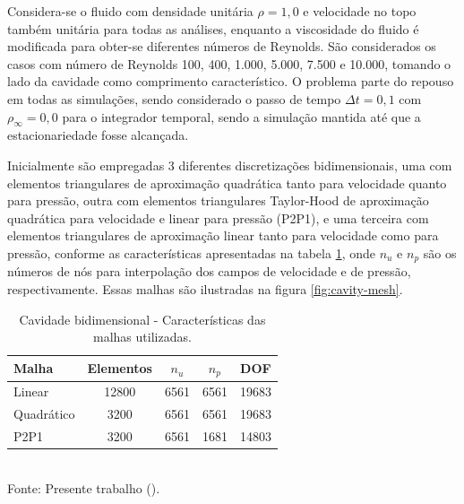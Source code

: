 Considera-se o fluido com densidade unitária $\rho=1,0$ e velocidade no topo também unitária para todas as análises, enquanto a viscosidade do fluido é modificada para obter-se diferentes números de Reynolds. São considerados os casos com número de Reynolds 100, 400, 1.000, 5.000, 7.500 e 10.000, tomando o lado da cavidade como comprimento característico. O problema parte do repouso em todas as simulações, sendo considerado o passo de tempo $\Delta t=0,1$ com $\rho_\infty=0,0$ para o integrador temporal, sendo a simulação mantida até que a estacionariedade fosse alcançada.

Inicialmente são empregadas 3 diferentes discretizações bidimensionais, uma com elementos triangulares de aproximação quadrática tanto para velocidade quanto para pressão, outra com elementos triangulares Taylor-Hood de aproximação quadrática para velocidade e linear para pressão (P2P1), e uma terceira com elementos triangulares de aproximação linear tanto para velocidade como para pressão, conforme as características apresentadas na tabela \ref{tab:cavity-mesh}, onde $n_u$ e $n_p$ são os números de nós para interpolação dos campos de velocidade e de pressão, respectivamente. Essas malhas são ilustradas na figura \ref{fig:cavity-mesh}.

\begin{table}[h!]
    \centering
    \caption{Cavidade bidimensional - Características das malhas utilizadas.}
    \begin{tabular}{lcccc}
        \hline
        Malha      & Elementos & $n_u$ & $n_p$ & DOF   \\\hline
        Linear     & 12800     & 6561  & 6561  & 19683 \\
        Quadrático & 3200      & 6561  & 6561  & 19683 \\
        P2P1       & 3200      & 6561  & 1681  & 14803 \\\hline
    \end{tabular}
    \\Fonte: Presente trabalho (\the\year).
    \label{tab:cavity-mesh}
\end{table}

